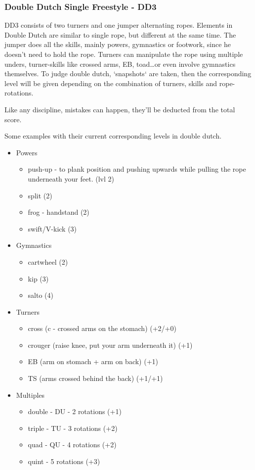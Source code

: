 \subsubsection{Double Dutch Single Freestyle - DD3}
\label{subsubsec:literature-dd3}

DD3 consists of two turners and one jumper alternating ropes. Elements in Double Dutch are similar to single rope, but different at the same time. The jumper does all the skills, mainly powers, gymnastics or footwork, since he doesn't need to hold the rope. Turners can manipulate the rope using multiple unders, turner-skills like crossed arms, EB, toad\dots or even involve gymnastics themselves.
To judge double dutch, `snapshots` are taken, then the corresponding level will be given depending on the combination of turners, skills and rope-rotations.

Like any discipline, mistakes can happen, they'll be deducted from the total score.

Some examples with their current corresponding levels in double dutch.

\begin{itemize}
    \item Powers
    \begin{itemize}
        \item push-up - to plank position and pushing upwards while pulling the rope underneath your feet. (lvl 2)
        \item split (2)
        \item frog - handstand (2)
        \item swift/V-kick (3)
    \end{itemize}
    \item Gymnastics
    \begin{itemize}
        \item cartwheel (2)
        \item kip (3)
        \item salto (4)
    \end{itemize}
    \item Turners
    \begin{itemize}
        \item cross (c - crossed arms on the stomach) (+2/+0)
        \item crouger (raise knee, put your arm underneath it) (+1)
        \item EB (arm on stomach + arm on back) (+1)
        \item TS (arms crossed behind the back) (+1/+1)
    \end{itemize}
    \item Multiples
    \begin{itemize}
        \item double - DU - 2 rotations (+1)
        \item triple - TU - 3 rotations (+2)
        \item quad - QU - 4 rotations (+2)
        \item quint - 5 rotations (+3)
    \end{itemize}
\end{itemize}

